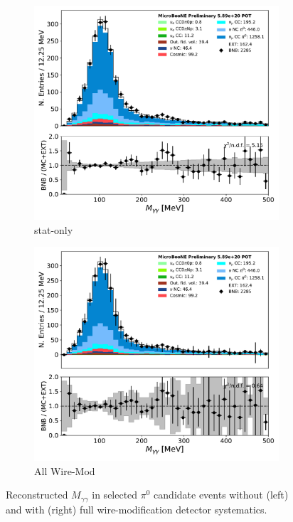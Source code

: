 \documentclass[a4paper]{article}
\begin{document}
\begin{figure}[H] 
\begin{center}
    \begin{subfigure}[b]{0.4\textwidth}
    \centering
    \includegraphics[width=1.00\textwidth]{detsys/datamc/pi0_mass_Y_03292020_statonly.pdf}
    \caption{\label{fig:detsys:datamc:mass:stat} stat-only}
    \end{subfigure}
    \begin{subfigure}[b]{0.4\textwidth}
    \centering
    \includegraphics[width=1.00\textwidth]{detsys/datamc/pi0_mass_Y_03292020_detsys.pdf}
    \caption{\label{fig:detsys:datamc:mass:all}All Wire-Mod}
    \end{subfigure}
\caption{\label{fig:detsys:datamc:mass}Reconstructed $M_{\gamma\gamma}$ in selected $\pi^0$ candidate events without (left) and with (right) full wire-modification detector systematics.}
\end{center}
\end{figure}
\end{document}
